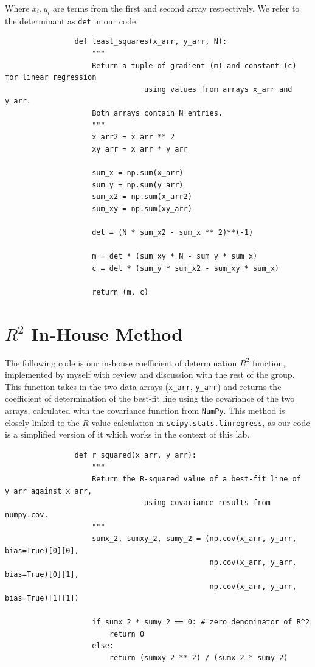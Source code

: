 \documentclass[preprint2]{aastex702}
\begin{document}
			Where $x_i, y_i$ are terms from the first and second array respectively. We refer to the determinant as \texttt{det} in our code.

			\begin{verbatim}
				def least_squares(x_arr, y_arr, N):
				    """
				    Return a tuple of gradient (m) and constant (c) for linear regression 
								using values from arrays x_arr and y_arr.
				    Both arrays contain N entries.
				    """    
				    x_arr2 = x_arr ** 2
				    xy_arr = x_arr * y_arr
				    
				    sum_x = np.sum(x_arr)
				    sum_y = np.sum(y_arr)
				    sum_x2 = np.sum(x_arr2)
				    sum_xy = np.sum(xy_arr)
				    
				    det = (N * sum_x2 - sum_x ** 2)**(-1)
				
				    m = det * (sum_xy * N - sum_y * sum_x)
				    c = det * (sum_y * sum_x2 - sum_xy * sum_x)
				
				    return (m, c)
			\end{verbatim}

		\section{$R^2$ In-House Method}\label{r-squared-code}

			The following code is our in-house coefficient of determination $R^2$ function, implemented by myself with review and discussion with the rest of the group. This function takes in the two data arrays (\texttt{x\_arr}, \texttt{y\_arr}) and returns the coefficient of determination of the best-fit line using the covariance of the two arrays, calculated with the covariance function from \texttt{NumPy}. This method is closely linked to the $R$ value calculation in \texttt{scipy.stats.linregress}, as our code is a simplified version of it which works in the context of this lab.

			\begin{verbatim}
				def r_squared(x_arr, y_arr):
				    """
				    Return the R-squared value of a best-fit line of y_arr against x_arr, 
								using covariance results from numpy.cov.
				    """
				    sumx_2, sumxy_2, sumy_2 = (np.cov(x_arr, y_arr, bias=True)[0][0], 
				                               np.cov(x_arr, y_arr, bias=True)[0][1], 
				                               np.cov(x_arr, y_arr, bias=True)[1][1])
				    
				    if sumx_2 * sumy_2 == 0: # zero denominator of R^2
				        return 0
				    else:
				        return (sumxy_2 ** 2) / (sumx_2 * sumy_2)
			\end{verbatim}
\end{document}
